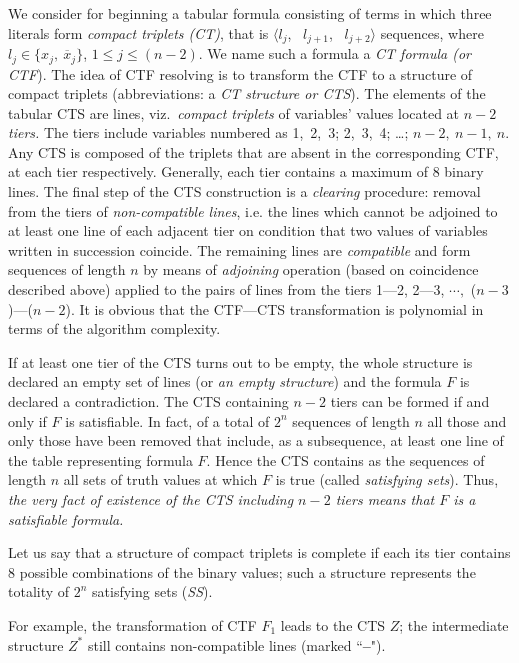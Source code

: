 \documentclass[12pt, a4paper]{article}
\begin{document}
We consider for beginning a tabular formula consisting of terms in which three literals form {\it compact triplets (CT)}, that is  $\langle l_j$,~ $l_{j+1}$,~ $l_{j+2}\rangle$ sequences, where $l_j \in \{ x_j, \ \overline{x}_j\}$, $1\le j\le (n-2)$. We name such a formula a {\it CT formula {\rm (or} CTF}). The idea of CTF resolving is to transform the CTF to a structure of compact triplets (abbreviations: a {\it CT structure {\rm or} CTS}). The elements of the tabular CTS are lines, viz.\ {\it compact triplets} of variables' values located at  $n-2$  {\it tiers.} The tiers include variables numbered as 1,~2,~3; 2,~3,~4; \dots ; $n-2,~n-1,~n.$  Any CTS is composed of the triplets that are absent in the corresponding CTF, at each tier respectively. Generally, each tier contains a maximum of 8 binary lines. The final step of the CTS construction is a {\it clearing} procedure: removal from the tiers of {\it non-compatible lines}, i.e. the lines which cannot be adjoined to at least one line of each adjacent tier on condition that two values of variables written in succession coincide. The remaining lines are {\it compatible} and form sequences of length $n$  by means of {\it adjoining} operation (based on coincidence described above) applied to the pairs of lines from the tiers 1---2, 2---3, $\cdots,$ ($n-3$)---($n-2$). It is obvious that the CTF---CTS transformation is polynomial in terms of the algorithm complexity.

If at least one tier of the CTS turns out to be empty, the whole structure is declared an empty set of lines (or {\it an empty structure}) and the formula $F$ is declared a contradiction.
The CTS containing $n-2$ tiers can be formed if and only if $F$ is satisfiable. In fact, of a total of $2^n$ sequences of length $n$ all those and only those have been removed that include, as a subsequence, at least one line of the table representing formula $F$. Hence the CTS contains as the sequences of length $n$ all sets of truth values at which  $F$  is true (called {\it satisfying sets}).  Thus, {\it the very fact of existence of the CTS including  $n-2$  tiers means  that  $F$  is a satisfiable formula.}

Let us say that a structure of compact triplets is complete if each its tier contains 8 possible combinations of the binary values; such a structure represents the totality of $2^n$ satisfying sets ({\it SS}).

For example, the transformation of CTF  $F_1$  leads to the CTS  $Z$; the intermediate structure $Z^*$  still contains non-compatible lines (marked ``{\bf --}").
\end{document}
